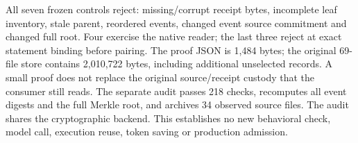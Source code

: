 All seven frozen controls reject: missing/corrupt receipt bytes, incomplete
leaf inventory, stale parent, reordered events, changed event source commitment
and changed full root. Four exercise the native reader; the last three reject
at exact statement binding before pairing. The proof JSON is 1,484 bytes;
the original 69-file store contains 2,010,722 bytes, including additional
unselected records. A small proof does not replace the original source/receipt
custody that the consumer still reads. The separate audit passes 218 checks,
recomputes all event digests and the full Merkle root, and archives 34 observed
source files. The audit shares the cryptographic backend. This establishes
no new behavioral check, model call, execution reuse, token saving or
production admission.
